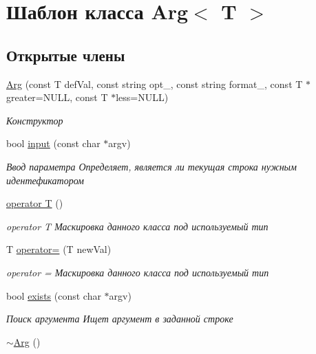 \hypertarget{class_arg}{\section{Шаблон класса Arg$<$ T $>$}
\label{class_arg}
}
\subsection*{Открытые члены}
\begin{DoxyCompactItemize}
\item 
\hyperlink{class_arg_a89090f9dc935c020f8d6b1caedfc47fc}{Arg} (const T def\-Val, const string opt\-\_\-, const string format\-\_\-, const T $\ast$greater=N\-U\-L\-L, const T $\ast$less=N\-U\-L\-L)
\begin{DoxyCompactList}\small\item\em Конструктор \end{DoxyCompactList}\item 
bool \hyperlink{class_arg_aded2a97404d7c21fbebc88d7fb0514bf}{input} (const char $\ast$argv)
\begin{DoxyCompactList}\small\item\em Ввод параметра Определяет, является ли текущая строка нужным идентефикатором \end{DoxyCompactList}\item 
\hyperlink{class_arg_a56700d1bd778ba6f731cfbe8389c495b}{operator T} ()
\begin{DoxyCompactList}\small\item\em operator T Маскировка данного класса под используемый тип \end{DoxyCompactList}\item 
T \hyperlink{class_arg_a360ad85ad5b00751ed51d70fa77705f8}{operator=} (T new\-Val)
\begin{DoxyCompactList}\small\item\em operator = Маскировка данного класса под используемый тип \end{DoxyCompactList}\item 
bool \hyperlink{class_arg_ab8617f74c7eeb311ab51fe1572731f01}{exists} (const char $\ast$argv)
\begin{DoxyCompactList}\small\item\em Поиск аргумента Ищет аргумент в заданной строке \end{DoxyCompactList}\item 
\hyperlink{class_arg_ad3ace51eba55f805a7aab729bb3115a3}{$\sim$\-Arg} ()
\end{DoxyCompactItemize}


